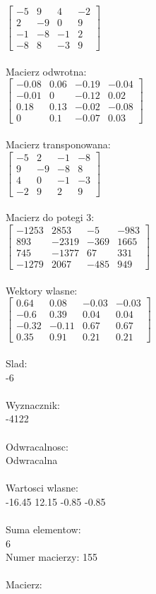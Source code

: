 \documentclass[a4paper,12pt]{article}
\begin{document}
$\begin{bmatrix} -5&9&4&-2\\2&-9&0&9\\-1&-8&-1&2\\-8&8&-3&9 \end{bmatrix}$
\\
\\
Macierz odwrotna:\\

$\begin{bmatrix} -0.08&0.06&-0.19&-0.04\\-0.01&0&-0.12&0.02\\0.18&0.13&-0.02&-0.08\\0&0.1&-0.07&0.03 \end{bmatrix}$
\\
\\
Macierz transponowana:\\

$\begin{bmatrix} -5&2&-1&-8\\9&-9&-8&8\\4&0&-1&-3\\-2&9&2&9 \end{bmatrix}$
\\
\\
Macierz do potegi 3:\\

$\begin{bmatrix} -1253&2853&-5&-983\\893&-2319&-369&1665\\745&-1377&67&331\\-1279&2067&-485&949 \end{bmatrix}$
\\
\\
Wektory wlasne:\\

$\begin{bmatrix} 0.64&0.08&-0.03&-0.03\\-0.6&0.39&0.04&0.04\\-0.32&-0.11&0.67&0.67\\0.35&0.91&0.21&0.21 \end{bmatrix}$
\\
\\
Slad:\\
-6
\\
\\
Wyznacznik:\\
-4122
\\
\\
Odwracalnosc:\\
Odwracalna
\\
\\
Wartosci wlasne:\\
-16.45 12.15 -0.85 -0.85
\\
\\
Suma elementow:\\
6
\\
\newpage
Numer macierzy:
155
\\
\\
Macierz:\\
\end{document}
